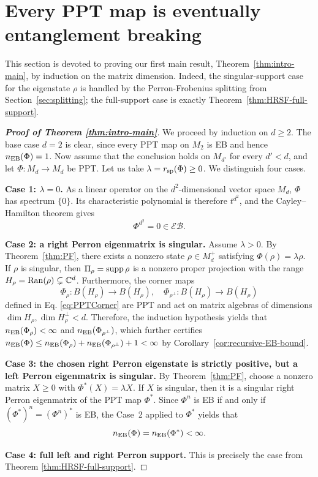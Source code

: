 \documentclass[11pt,reqno]{amsart}
\theoremstyle{definition}
\theoremstyle{definition}
\theoremstyle{definition}
\theoremstyle{definition}
\newcommand{\Comp}{\mathbb{C}}
\newcommand{\EB}{\mathcal{EB}}
\begin{document}
\section{Every PPT map is eventually entanglement breaking}
\label{sec:eventual}

This section is devoted to proving our first main result, Theorem~\ref{thm:intro-main}, by induction on the matrix dimension. Indeed, the singular-support case for the eigenstate $\rho$ is handled by the Perron-Frobenius
splitting from Section~\ref{sec:splitting}; the full-support case is exactly
Theorem~\ref{thm:HRSF-full-support}.

\begin{proof}[\textbf{Proof of Theorem \ref{thm:intro-main}}]
We proceed by induction on $d\geq 2$. The base case $d=2$ is clear, since every PPT map on $M_2$ is EB and hence $n_{\rm EB}(\Phi)=1$. Now assume that the conclusion holds on $M_{d'}$ for every $d'<d$, and let
$\Phi:M_d\to M_d$ be PPT. Let us take $\lambda=r_{\rm sp}(\Phi)\geq 0$.
We distinguish four cases.

\medskip
\noindent\textbf{Case 1: $\lambda=0$.}
As a linear operator on the $d^2$-dimensional vector space $M_d$,
$\Phi$ has spectrum $\{0\}$. Its characteristic polynomial is
therefore $t^{d^2}$, and the Cayley--Hamilton theorem gives
    $$\Phi^{d^2}=0\in \EB.$$

\medskip
\noindent\textbf{Case 2: a right Perron eigenmatrix is singular.}
Assume $\lambda>0$.  By Theorem~\ref{thm:PF}, there exists a nonzero state
$\rho\in M_d^+$ satisfying $\Phi(\rho)=\lambda\rho.$ If $\rho$ is singular, then
$\Pi_{\rho}={\rm supp\,}\rho$ is a nonzero proper projection with the range $H_{\rho}={\rm Ran}(\rho)\subsetneq \Comp^d$.  Furthermore, the corner maps
    $$\Phi_{\rho}:B(H_{\rho})\to B(H_{\rho}), \quad \Phi_{\rho^{\perp}}:B(H_{\rho})\to B(H_{\rho})$$
defined in Eq. \eqref{eq:PPTCorner} are PPT and act on matrix algebras of dimensions $\dim H_{\rho}, \dim H_{\rho}^{\perp}<d$.  Therefore, the induction hypothesis yields that $n_{\rm EB}(\Phi_{\rho})<\infty$ and $n_{\rm EB}(\Phi_{\rho^{\perp}})$, which further certifies $n_{\rm EB}(\Phi)\leq n_{\rm EB}(\Phi_{\rho})+n_{\rm EB}(\Phi_{\rho^{\perp}})+1<\infty$ by Corollary~\ref{cor:recursive-EB-bound}.

\medskip
\noindent\textbf{Case 3: the chosen right Perron eigenstate is strictly positive,
but a left Perron eigenmatrix is singular.}
By Theorem~\ref{thm:PF}, choose a nonzero matrix $X\geq 0$ with $\Phi^*(X)=\lambda X.$
If $X$ is singular, then it is a singular right Perron eigenmatrix of the
PPT map $\Phi^*$. Since $\Phi^n$ is EB if and only if $(\Phi^*)^n = (\Phi^n)^*$ is EB, the Case~2 applied to $\Phi^*$ yields that
    $$n_{\rm EB}(\Phi) = n_{\rm EB}(\Phi^*)<\infty.$$

\medskip
\noindent\textbf{Case 4: full left and right Perron support.}
This is precisely the case from Theorem \ref{thm:HRSF-full-support}.
\end{proof}
\end{document}
